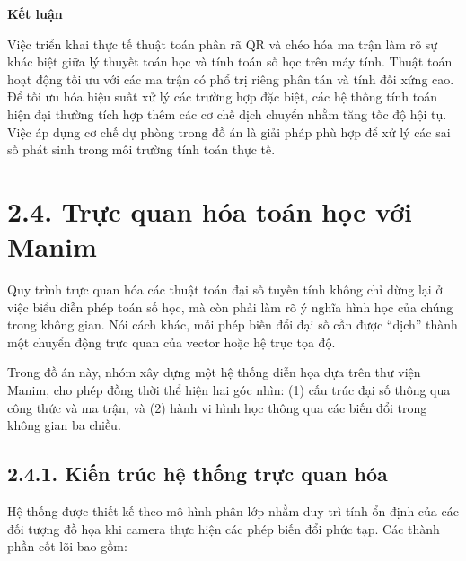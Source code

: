 \textbf{Kết luận}

Việc triển khai thực tế thuật toán phân rã QR và chéo hóa ma trận làm rõ sự khác biệt giữa lý thuyết toán học và tính toán số học trên máy tính. Thuật toán hoạt động tối ưu với các ma trận có phổ trị riêng phân tán và tính đối xứng cao. Để tối ưu hóa hiệu suất xử lý các trường hợp đặc biệt, các hệ thống tính toán hiện đại thường tích hợp thêm các cơ chế dịch chuyển nhằm tăng tốc độ hội tụ. Việc áp dụng cơ chế dự phòng trong đồ án là giải pháp phù hợp để xử lý các sai số phát sinh trong môi trường tính toán thực tế.

\section*{2.4. Trực quan hóa toán học với Manim}
{}

Quy trình trực quan hóa các thuật toán đại số tuyến tính không chỉ dừng lại ở việc biểu diễn phép toán số học, mà còn phải làm rõ ý nghĩa hình học của chúng trong không gian. Nói cách khác, mỗi phép biến đổi đại số cần được “dịch” thành một chuyển động trực quan của vector hoặc hệ trục tọa độ.

Trong đồ án này, nhóm xây dựng một hệ thống diễn họa dựa trên thư viện Manim, cho phép đồng thời thể hiện hai góc nhìn: (1) cấu trúc đại số thông qua công thức và ma trận, và (2) hành vi hình học thông qua các biến đổi trong không gian ba chiều.

\subsection*{2.4.1. Kiến trúc hệ thống trực quan hóa}
{}

Hệ thống được thiết kế theo mô hình phân lớp nhằm duy trì tính ổn định của các đối tượng đồ họa khi camera thực hiện các phép biến đổi phức tạp. Các thành phần cốt lõi bao gồm:

